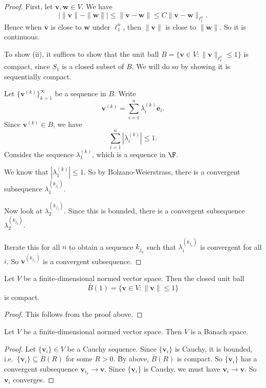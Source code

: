 \documentclass[a4paper]{article}
\begin{document}
\begin{proof}
  First, let $\mathbf{v}, \mathbf{w}\in V$. We have
  \[
    \big|\|\mathbf{v}\| - \|\mathbf{w}\|\big| \leq \|\mathbf{v} - \mathbf{w}\| \leq C\|\mathbf{v} - \mathbf{w}\|_{\ell_1^n}.
  \]
  Hence when $\mathbf{v}$ is close to $\mathbf{w}$ under $\ell_1^n$, then $\|\mathbf{v}\|$ is close to $\|\mathbf{w}\|$. So it is continuous.

  To show (ii), it suffices to show that the unit ball $B = \{\mathbf{v} \in V: \|\mathbf{v}\|_{\ell_1^n}\leq 1\}$ is compact, since $S_1$ is a closed subset of $B$. We will do so by showing it is sequentially compact.

  Let $\{\mathbf{v}^{(k)}\}_{k = 1}^\infty$ be a sequence in $B$. Write
  \[
    \mathbf{v}^{(k)} = \sum_{i = 1}^n \lambda_i^{(k)} \mathbf{e}_i.
  \]
  Since $\mathbf{v}^{(k)} \in B$, we have
  \[
    \sum_{i = 1}^n |\lambda_i^{(k)}| \leq 1.
  \]
  Consider the sequence $\lambda_1^{(k)}$, which is a sequence in $\F$.

  We know that $|\lambda_1^{(k)}| \leq 1$. So by Bolzano-Weierstrass, there is a convergent subsequence $\lambda_1^{(k_{j_1})}$.

  Now look at $\lambda_2^{(k_{j_1})}$. Since this is bounded, there is a convergent subsequence $\lambda_2^{(k_{j_2})}$.

  Iterate this for all $n$ to obtain a sequence $k_{j_n}$ such that $\lambda_i^{(k_{j_n})}$ is convergent for all $i$. So $\mathbf{v}^{(k_{j_n})}$ is a convergent subsequence.
\end{proof}

\begin{prop}
  Let $V$ be a finite-dimensional normed vector space. Then the closed unit ball
  \[
    \bar{B}(1) = \{\mathbf{v} \in V: \|\mathbf{v}\| \leq 1\}
  \]
  is compact.
\end{prop}

\begin{proof}
  This follows from the proof above.
\end{proof}

\begin{prop}
  Let $V$ be a finite-dimensional normed vector space. Then $V$ is a Banach space.
\end{prop}

\begin{proof}
  Let $\{\mathbf{v}_i\} \in V$ be a Cauchy sequence. Since $\{\mathbf{v}_i\}$ is Cauchy, it is bounded, i.e.\ $\{\mathbf{v}_i\} \subseteq \bar{B}(R)$ for some $R > 0$. By above, $\bar{B}(R)$ is compact. So $\{\mathbf{v}_i\}$ has a convergent subsequence $\mathbf{v}_{i_k} \to \mathbf{v}$. Since $\{\mathbf{v}_i\}$ is Cauchy, we must have $\mathbf{v}_i \to \mathbf{v}$. So $\mathbf{v}_i$ converges.
\end{proof}
\end{document}
